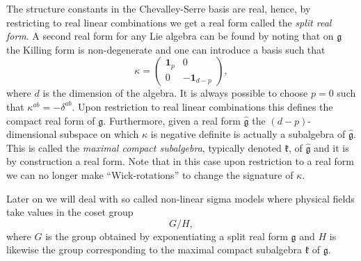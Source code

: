 The structure constants in the Chevalley-Serre basis are real, hence, by restricting to real linear combinations we get a real form called the \emph{split real form}. A second real form for any Lie algebra can be found by noting that on $\mathfrak{g}$ the Killing form is non-degenerate and one can introduce a basis such that 
\begin{equation}
    \kappa = \begin{pmatrix}\mathbf{1}_p& 0\\0&-\mathbf{1}_{d-p}
    \end{pmatrix},
\end{equation}
where $d$ is the dimension of the algebra. It is always possible to choose $p=0$ such that $\kappa^{ab} = -\delta^{ab}$. Upon restriction to real linear combinations this defines the compact real form of $\mathfrak{g}$. Furthermore, given a real form $\hat{\mathfrak{g}}$ the $(d-p)$-dimensional subspace on which $\kappa$ is negative definite is actually a subalgebra of $\hat{\mathfrak{g}}$. This is called the \emph{maximal compact subalgebra}, typically denoted $\mathfrak{k}$, of $\hat{\mathfrak{g}}$ and it is by construction a real form. Note that in this case upon restriction to a real form we can no longer make ``Wick-rotations'' to change the signature of $\kappa$.

Later on we will deal with so called non-linear sigma models where physical fields take values in the coset group
\begin{equation}
G/H,
\end{equation}
where $G$ is the group obtained by exponentiating a split real form $\mathfrak{g}$ and $H$ is likewise the group corresponding to the maximal compact subalgebra $\mathfrak{k}$ of $\mathfrak{g}$.  

